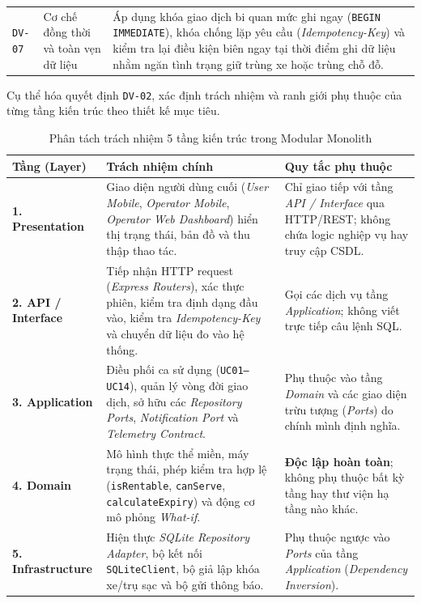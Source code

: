 \begin{longtable}{>{\centering\arraybackslash}p{1.6cm} >{\raggedright\arraybackslash}p{4.1cm} >{\raggedright\arraybackslash}p{8.6cm}}
\midrule
\texttt{DV-07} & Cơ chế đồng thời và toàn vẹn dữ liệu & Áp dụng khóa giao dịch bi quan mức ghi ngay (\texttt{BEGIN IMMEDIATE}), khóa chống lặp yêu cầu (\textit{Idempotency-Key}) và kiểm tra lại điều kiện biên ngay tại thời điểm ghi dữ liệu nhằm ngăn tình trạng giữ trùng xe hoặc trùng chỗ đỗ. \\
\end{longtable}

Cụ thể hóa quyết định \texttt{DV-02},  xác định trách nhiệm và ranh giới phụ thuộc của từng tầng kiến trúc theo thiết kế mục tiêu.

\begin{table}[H]
\centering
\caption{Phân tách trách nhiệm 5 tầng kiến trúc trong Modular Monolith}
\label{tab:5-layers}
\begin{tabular}{>{\raggedright\arraybackslash}p{3.0cm} >{\raggedright\arraybackslash}p{6.2cm} >{\raggedright\arraybackslash}p{5.1cm}}
\toprule
\textbf{Tầng (Layer)} & \textbf{Trách nhiệm chính} & \textbf{Quy tắc phụ thuộc} \\
\midrule
\textbf{1. Presentation} & Giao diện người dùng cuối (\textit{User Mobile}, \textit{Operator Mobile}, \textit{Operator Web Dashboard}) hiển thị trạng thái, bản đồ và thu thập thao tác. & Chỉ giao tiếp với tầng \textit{API / Interface} qua HTTP/REST; không chứa logic nghiệp vụ hay truy cập CSDL. \\
\midrule
\textbf{2. API / Interface} & Tiếp nhận HTTP request (\textit{Express Routers}), xác thực phiên, kiểm tra định dạng đầu vào, kiểm tra \textit{Idempotency-Key} và chuyển dữ liệu đo vào hệ thống. & Gọi các dịch vụ tầng \textit{Application}; không viết trực tiếp câu lệnh SQL. \\
\midrule
\textbf{3. Application} & Điều phối ca sử dụng (\texttt{UC01--UC14}), quản lý vòng đời giao dịch, sở hữu các \textit{Repository Ports}, \textit{Notification Port} và \textit{Telemetry Contract}. & Phụ thuộc vào tầng \textit{Domain} và các giao diện trừu tượng (\textit{Ports}) do chính mình định nghĩa. \\
\midrule
\textbf{4. Domain} & Mô hình thực thể miền, máy trạng thái, phép kiểm tra hợp lệ (\texttt{isRentable}, \texttt{canServe}, \texttt{calculateExpiry}) và động cơ mô phỏng \textit{What-if}. & \textbf{Độc lập hoàn toàn}; không phụ thuộc bất kỳ tầng hay thư viện hạ tầng nào khác. \\
\midrule
\textbf{5. Infrastructure} & Hiện thực \textit{SQLite Repository Adapter}, bộ kết nối \texttt{SQLiteClient}, bộ giả lập khóa xe/trụ sạc và bộ gửi thông báo. & Phụ thuộc ngược vào \textit{Ports} của tầng \textit{Application} (\textit{Dependency Inversion}). \\
\bottomrule
\end{tabular}
\end{table}

